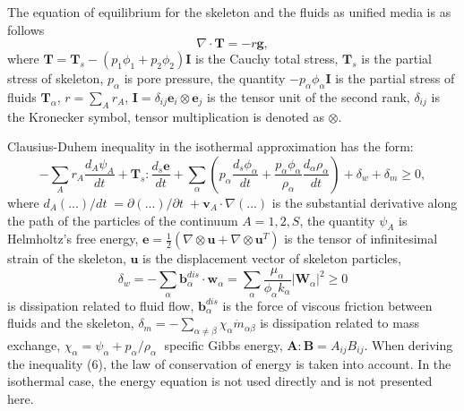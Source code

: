 \documentclass[article,authoryear,jpm]{beg_39}             %
\begin{document}
The equation of equilibrium for the skeleton and the fluids as unified media is as follows
\begin{equation}
\nabla \cdot \mathbf{T}=-r\mathbf{g},
\end{equation}
where $\mathbf{T}={{\mathbf{T}}_{s}}-\left( {{p}_{1}}{{\phi }_{1}}+{{p}_{2}}{{\phi }_{2}} \right)\mathbf{I}$ is the Cauchy total stress, ${{\mathbf{T}}_{s}}$ is the partial stress of skeleton, ${{p}_{\alpha }}$ is pore pressure, the quantity $-{{p}_{\alpha }}{{\phi }_{\alpha }}\mathbf{I}$ is the partial stress of fluids ${{\mathbf{T}}_{\alpha }}$, $r=\sum\limits_{A}{{{r}_{A}}}$, $\mathbf{I}={{\delta }_{ij}}{{\mathbf{e}}_{i}}\otimes {{\mathbf{e}}_{j}}$ is the tensor unit of the second rank, ${{\delta }_{ij}}$ is the Kronecker symbol, tensor multiplication is denoted as $\otimes$.

Clausius-Duhem inequality in the isothermal approximation has the form:
\begin{equation}
-\sum\limits_{A}{{{r}_{A}}\frac{{{d}_{A}}{{\psi }_{A}}}{dt}}+{{\mathbf{T}}_{s}}:\frac{{{d}_{s}}\mathbf{e}}{dt}+\sum\limits_{\alpha }{\left( {{p}_{\alpha }}\frac{{{d}_{s}}{{\phi }_{\alpha }}}{dt}+\frac{{{p}_{\alpha }}{{\phi }_{\alpha }}}{{{\rho }_{\alpha }}}\frac{{{d}_{\alpha }}{{\rho }_{\alpha }}}{dt} \right)}+{{\delta }_{w}}+{{\delta }_{m}}\ge 0,
\end{equation}
where ${{{d}_{A}}\left( ... \right)}/{dt}\;={\partial \left( ... \right)}/{\partial t}\;+{{\mathbf{v}}_{A}}\cdot \nabla (...)$ is the substantial derivative along the path of the particles of the continuum $A=1,2,S$, the quantity ${{\psi }_{A}}$ is Helmholtz’s free energy, $\mathbf{e}=\frac{1}{2}\left( \nabla \otimes \mathbf{u}+\nabla \otimes {{\mathbf{u}}^{T}} \right)$ is the tensor of infinitesimal strain of the skeleton, $\mathbf{u}$ is the displacement vector of skeleton particles, $${{\delta }_{w}}=-\sum\limits_{\alpha }{\mathbf{b}_{\alpha }^{dis}}\cdot {{\mathbf{w}}_{\alpha }}=\sum\limits_{\alpha }{\frac{{{\mu }_{\alpha }}}{{{\phi }_{\alpha }}{{k}_{\alpha }}}{{\left| {{\mathbf{W}}_{\alpha }} \right|}^{2}}}\ge 0$$ is dissipation related to fluid flow, $\mathbf{b}_{\alpha }^{dis}$ is the force of viscous friction between fluids and the skeleton, ${{\delta }_{m}}=-\sum\limits_{\alpha \ne \beta }{{{\chi }_{\alpha }}{{{\dot{m}}}_{\alpha \beta }}}$ is dissipation related to mass exchange, ${{\chi }_{\alpha }}={{\psi }_{\alpha }}+{{{p}_{\alpha }}}/{{{\rho }_{\alpha }}}\;$ specific Gibbs energy, $\mathbf{A}:\mathbf{B}={{A}_{ij}}{{B}_{ij}}$.
When deriving the inequality (6), the law of conservation of energy is taken into account.
In the isothermal case, the energy equation is not used directly and is not presented here.
\end{document}
